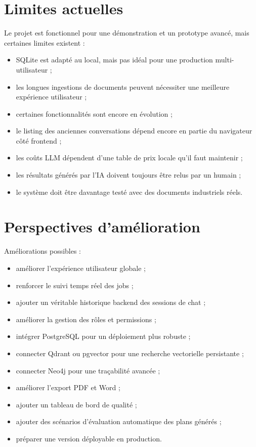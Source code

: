 \documentclass[
  french,
]{report}
\providecommand{\tightlist}{%
  \setlength{\itemsep}{0pt}\setlength{\parskip}{0pt}}
\begin{document}
\chapter{Limites actuelles}\label{limites-actuelles}

Le projet est fonctionnel pour une démonstration et un prototype avancé,
mais certaines limites existent :

\begin{itemize}
\tightlist
\item
  SQLite est adapté au local, mais pas idéal pour une production
  multi-utilisateur ;
\item
  les longues ingestions de documents peuvent nécessiter une meilleure
  expérience utilisateur ;
\item
  certaines fonctionnalités sont encore en évolution ;
\item
  le listing des anciennes conversations dépend encore en partie du
  navigateur côté frontend ;
\item
  les coûts LLM dépendent d'une table de prix locale qu'il faut
  maintenir ;
\item
  les résultats générés par l'IA doivent toujours être relus par un
  humain ;
\item
  le système doit être davantage testé avec des documents industriels
  réels.
\end{itemize}

\chapter{Perspectives
d'amélioration}\label{perspectives-damuxe9lioration}

Améliorations possibles :

\begin{itemize}
\tightlist
\item
  améliorer l'expérience utilisateur globale ;
\item
  renforcer le suivi temps réel des jobs ;
\item
  ajouter un véritable historique backend des sessions de chat ;
\item
  améliorer la gestion des rôles et permissions ;
\item
  intégrer PostgreSQL pour un déploiement plus robuste ;
\item
  connecter Qdrant ou pgvector pour une recherche vectorielle
  persistante ;
\item
  connecter Neo4j pour une traçabilité avancée ;
\item
  améliorer l'export PDF et Word ;
\item
  ajouter un tableau de bord de qualité ;
\item
  ajouter des scénarios d'évaluation automatique des plans générés ;
\item
  préparer une version déployable en production.
\end{itemize}
\end{document}
